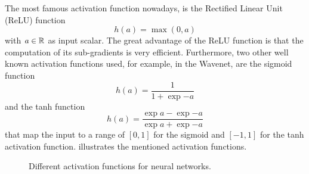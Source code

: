 The most famous activation function nowadays, is the Rectified Linear Unit (ReLU) \cite{Zeiler2013_relu} function
\begin{equation}\label{eq:nn_theory_relu}
  h(a) = \max{(0, a)}
\end{equation}
with $a \in \mathbb{R}$ as input scalar.
The great advantage of the ReLU function is that the computation of its sub-gradients is very efficient.
Furthermore, two other well known activation functions used, for example, in the Wavenet, are the sigmoid function
\begin{equation}\label{eq:nn_theory_sigmoid}
  h(a) = \frac{1}{1 + \exp{-a}}
\end{equation}
and the tanh function
\begin{equation}\label{eq:nn_theory_tanh}
  h(a) = \frac{\exp{a} - \exp{-a}}{\exp{a} + \exp{-a}}
\end{equation}
that map the input to a range of $[0, 1]$ for the sigmoid and $[-1, 1]$ for the tanh activation function.
 illustrates the mentioned activation functions.
\begin{figure}[!ht]
  \centering
    \quad
    \quad
  \caption{Different activation functions for neural networks.}
  \label{fig:nn_theory_activation}
\end{figure}
\FloatBarrier
\noindent


